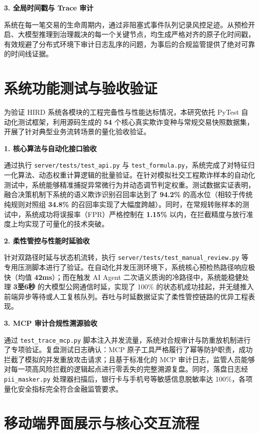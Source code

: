 \documentclass{xduugthesis}
\begin{document}
\textbf{3. 全局时间戳与 Trace 审计}

系统在每一笔交易的生命周期内，通过非阻塞式事件队列记录风控足迹。从预检开启、大模型推理到治理裁决的每一个关键节点，均生成严格对齐的原子化时间戳，有效规避了分布式环境下审计日志乱序的问题，为事后的合规监管提供了绝对可靠的时间线证据。

\section{系统功能测试与验收验证}

为验证 HIRD 系统各模块的工程完备性与性能达标情况，本研究依托 PyTest 自动化测试框架，利用源码生成的 \textbf{54} 个核心真实欺诈变种与常规交易快照数据集，开展了针对典型业务流转场景的量化验收验证。

\textbf{1. 核心算法与自动化接口验收}

通过执行 \texttt{server/tests/test\_api.py} 与 \texttt{test\_formula.py}，系统完成了对特征归一化算法、动态权重计算逻辑的批量验证。在针对模拟社交工程欺诈样本的自动化测试中，系统能够精准捕捉异常微行为并动态调节判定权重。测试数据实证表明，融合决策机制下系统的语义欺诈识别召回率达到了 \textbf{94.2\%} 的高水位（相较于传统纯规则对照组 \textbf{34.8\%} 的召回率实现了大幅度跨越）。同时，在常规转账样本的测试中，系统成功将误报率（FPR）严格控制在 \textbf{1.15\%} 以内，在拦截精度与放行准度上均实现了可量化的技术突破。

\textbf{2. 柔性管控与性能时延验收}

针对双路径时延与状态机流转，执行 \texttt{server/tests/test\_manual\_review.py} 等专用压测脚本进行了验证。在自动化并发压测环境下，系统核心预检热路径响应极快（均值 \textbf{42ms}）；而在触发 AI Agent 二次语义质询的冷路径中，系统能稳健处理 \textbf{3至6秒} 的大模型公网通信时延，实现了 100\% 的状态机成功挂起，并无缝推入前端异步等待或人工复核队列。吞吐与时延数据证实了柔性管控链路的优异工程表现。

\textbf{3. MCP 审计合规性溯源验收}

通过 \texttt{test\_trace\_mcp.py} 脚本注入并发流量，系统对合规审计与防重放机制进行了专项验证。复盘测试日志确认：MCP 原子工具严格履行了幂等防护职责，成功拦截了模拟的并发重放攻击请求；且基于标准化的 MCP 审计日志，监管人员能够对每一项高风险拦截的逻辑起点进行零丢失的完整溯源复盘。同时，落盘日志经 \texttt{pii\_masker.py} 处理器扫描后，银行卡与手机号等敏感信息脱敏率达 100\%，各项量化安全指标完全符合金融监管要求。

\section{移动端界面展示与核心交互流程}
\end{document}
